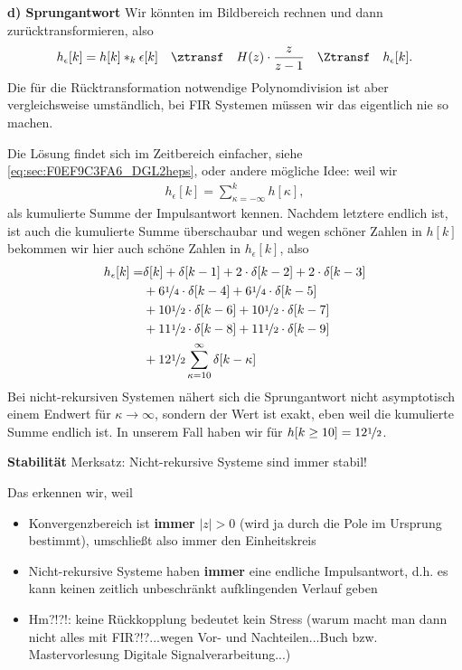\begin{ExCalc}
\textbf{d) Sprungantwort}
Wir könnten im Bildbereich rechnen und dann zurücktransformieren, also
\begin{align}
h_\epsilon[k] = h[k]\ast_k \epsilon[k] \quad\ztransf\quad
H(z) \cdot \frac{z}{z-1} \quad\Ztransf\quad h_\epsilon[k].
\end{align}
Die für die Rücktransformation notwendige Polynomdivision ist aber
vergleichsweise umständlich, bei FIR Systemen müssen wir das eigentlich nie so
machen.



%
Die Lösung findet sich im Zeitbereich einfacher, siehe \eqref{eq:sec:F0EF9C3FA6_DGL2heps},
oder andere mögliche Idee: weil wir
\begin{align}
h_\epsilon[k] = \sum_{\kappa=-\infty}^{k} h[\kappa],
\end{align}
als kumulierte Summe der Impulsantwort kennen. Nachdem letztere endlich ist,
ist auch die kumulierte Summe überschaubar und wegen schöner Zahlen in $h[k]$
bekommen wir hier auch schöne Zahlen in $h_\epsilon[k]$, also
\begin{align}
h_\epsilon[k] =
&\delta[k]
+\delta[k-1]
+2\cdot\delta[k-2]
+2\cdot\delta[k-3]\nonumber\\
&+6\nicefrac{1}{4}\cdot\delta[k-4]
+6\nicefrac{1}{4}\cdot\delta[k-5]\nonumber\\
&+10\nicefrac{1}{2}\cdot\delta[k-6]
+10\nicefrac{1}{2}\cdot\delta[k-7]\nonumber\\
&+11\nicefrac{1}{2}\cdot\delta[k-8]
+11\nicefrac{1}{2}\cdot\delta[k-9]\nonumber\\
&+12\nicefrac{1}{2}\sum_{\kappa=10}^{\infty}\delta[k-\kappa]
\end{align}
Bei nicht-rekursiven Systemen nähert sich die Sprungantwort nicht
asymptotisch einem Endwert für $\kappa\to\infty$, sondern der Wert ist exakt,
eben weil die kumulierte Summe endlich ist. In unserem Fall haben wir für
$h[k\geq 10] = 12\nicefrac{1}{2}$.

\textbf{Stabilität}
Merksatz: Nicht-rekursive Systeme sind immer stabil!

Das erkennen wir, weil
\begin{itemize}
  \item Konvergenzbereich ist \textbf{immer} $|z|>0$ (wird ja durch die Pole im Ursprung bestimmt), umschließt also immer den Einheitskreis
  \item Nicht-rekursive Systeme haben \textbf{immer} eine endliche Impulsantwort, d.h. es kann keinen zeitlich unbeschränkt aufklingenden Verlauf geben
  \item Hm?!?!: keine Rückkopplung bedeutet kein Stress (warum macht man dann nicht alles mit FIR?!?...wegen Vor- und Nachteilen...Buch bzw. Mastervorlesung Digitale Signalverarbeitung...)
\end{itemize}



\end{ExCalc}
\begin{Loesung}
\end{Loesung}

